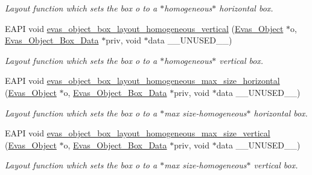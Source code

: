 \begin{DoxyCompactItemize}
\begin{DoxyCompactList}\small\item\em Layout function which sets the box {\itshape o\/} to a $\ast$homogeneous$\ast$ horizontal box. \item\end{DoxyCompactList}\item 
EAPI void \hyperlink{group__Evas__Object__Box_gaa860afd56866955550ae650464d2dc9a}{evas\_\-object\_\-box\_\-layout\_\-homogeneous\_\-vertical} (\hyperlink{group__Evas__Object__Group_ga9e19e6dd1f517a0ba437c0114d3e7c97}{Evas\_\-Object} $\ast$o, \hyperlink{struct__Evas__Object__Box__Data}{Evas\_\-Object\_\-Box\_\-Data} $\ast$priv, void $\ast$data \_\-\_\-UNUSED\_\-\_\-)
\begin{DoxyCompactList}\small\item\em Layout function which sets the box {\itshape o\/} to a $\ast$homogeneous$\ast$ vertical box. \item\end{DoxyCompactList}\item 
EAPI void \hyperlink{group__Evas__Object__Box_gab9e441a27ebe6253ef1b9d6d25ee9bc4}{evas\_\-object\_\-box\_\-layout\_\-homogeneous\_\-max\_\-size\_\-horizontal} (\hyperlink{group__Evas__Object__Group_ga9e19e6dd1f517a0ba437c0114d3e7c97}{Evas\_\-Object} $\ast$o, \hyperlink{struct__Evas__Object__Box__Data}{Evas\_\-Object\_\-Box\_\-Data} $\ast$priv, void $\ast$data \_\-\_\-UNUSED\_\-\_\-)
\begin{DoxyCompactList}\small\item\em Layout function which sets the box {\itshape o\/} to a $\ast$max size-\/homogeneous$\ast$ horizontal box. \item\end{DoxyCompactList}\item 
EAPI void \hyperlink{group__Evas__Object__Box_gabccbf4cf59018eac96c9281576b61abf}{evas\_\-object\_\-box\_\-layout\_\-homogeneous\_\-max\_\-size\_\-vertical} (\hyperlink{group__Evas__Object__Group_ga9e19e6dd1f517a0ba437c0114d3e7c97}{Evas\_\-Object} $\ast$o, \hyperlink{struct__Evas__Object__Box__Data}{Evas\_\-Object\_\-Box\_\-Data} $\ast$priv, void $\ast$data \_\-\_\-UNUSED\_\-\_\-)
\begin{DoxyCompactList}\small\item\em Layout function which sets the box {\itshape o\/} to a $\ast$max size-\/homogeneous$\ast$ vertical box. \item\end{DoxyCompactList}\item 

\end{DoxyCompactItemize}
